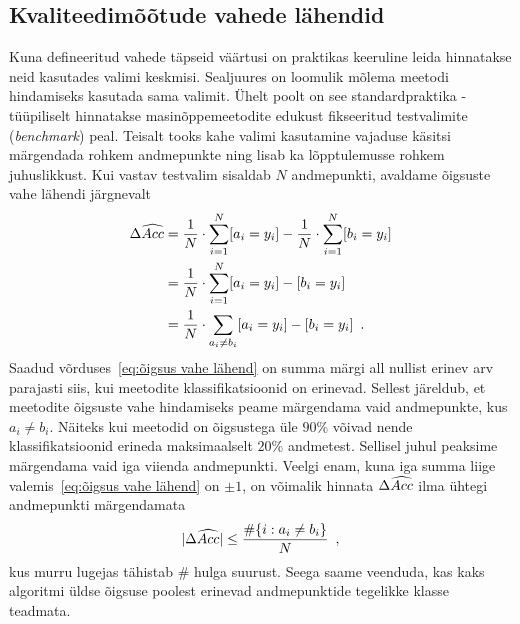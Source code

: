 \subsection{Kvaliteedimõõtude vahede lähendid}
Kuna defineeritud vahede täpseid väärtusi on praktikas keeruline leida hinnatakse neid kasutades valimi keskmisi. Sealjuures on loomulik mõlema meetodi hindamiseks kasutada sama valimit. Ühelt poolt on see standardpraktika - tüüpiliselt hinnatakse masinõppemeetodite edukust fikseeritud testvalimite (\emph{benchmark}) peal. Teisalt tooks kahe valimi kasutamine vajaduse käsitsi märgendada rohkem andmepunkte ning lisab ka lõpptulemusse rohkem juhuslikkust. Kui vastav testvalim sisaldab $N$ andmepunkti, avaldame õigsuste vahe lähendi järgnevalt
\begin{align}
    \Delta \widehat{Acc} &= \frac{1}{N} \cdot \sum_{i = 1}^{N} [a_i = y_i] - \frac{1}{N} \cdot \sum_{i = 1}^{N} [b_i = y_i] \nonumber\\
    &= \frac{1}{N} \cdot \sum_{i = 1}^{N} [a_i = y_i] - [b_i = y_i] \nonumber\\
    &= \frac{1}{N} \cdot \sum_{a_i \neq b_i} [a_i = y_i] - [b_i = y_i] \enspace. \label{eq:õigsus vahe lähend}
\end{align}
Saadud võrduses~\eqref{eq:õigsus vahe lähend} on summa märgi all nullist erinev arv parajasti siis, kui meetodite klassifikatsioonid on erinevad. Sellest järeldub, et meetodite õigsuste vahe hindamiseks peame märgendama vaid andmepunkte, kus $a_i \neq b_i$. Näiteks kui meetodid on õigsustega üle $90\%$ võivad nende klassifikatsioonid erineda maksimaalselt $20\%$ andmetest. Sellisel juhul peaksime märgendama vaid iga viienda andmepunkti. Veelgi enam, kuna iga summa liige valemis~\eqref{eq:õigsus vahe lähend} on $\pm 1$, on võimalik hinnata $\Delta \widehat{Acc}$ ilma ühtegi andmepunkti märgendamata
\begin{equation}
    \label{eq:õigsus vahe lähend tõke}
    | \Delta \widehat{Acc} | \leq \frac{\# \{i: a_i \neq b_i \}}{N} \enspace,
\end{equation}
kus murru lugejas tähistab $\#$ hulga suurust. Seega saame veenduda, kas kaks algoritmi üldse õigsuse poolest erinevad andmepunktide tegelikke klasse teadmata.

